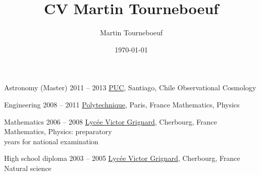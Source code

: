 \def\tbflanguage{english}

\ifx\HCode\undefined
  \providecommand{\tbfbordertop}{1.2}
  \providecommand\tbfborderleft{0.7}
  \providecommand\tbfwidth{12.4}
\else
  \providecommand{\tbfbordertop}{1}
  \providecommand\tbfborderleft{0.7}
  \providecommand\tbfwidth{12.4}

\ifx\HCode\undefined

%
\else

%
\fi

\title{CV Martin Tourneboeuf}
\author{Martin Tourneboeuf}
\date{\today}









\begin{coordinatelist}
\end{coordinatelist}



\pgfmathsetmacro{\tbfyeary}{\tbfbordertop+3.1}

\begin{yearlist}[7.7][\tbfborderleft][\tbfyeary]


\item[Astronomy (Master)]{2011 -- 2013}
  {
  \href{http://www.uc.cl/}{PUC}, Santiago, Chile
  }
  {   Observational Cosmology}


\item[Engineering]{2008 -- 2011}
  {
  \tbfix
  \href{https://www.polytechnique.edu/}{Polytechnique}, Paris, France
  }
  {    Mathematics, Physics}


\item[Mathematics]{2006 -- 2008}
  {
  \href{http://www.lycee-grignard.fr/}{Lyc\'ee Victor Grignard}, Cherbourg, France
  }
  {    Mathematics, Physics: preparatory \\ years for national examination}


\item[High school diploma]{2003 -- 2005}
  {
  \href{http://www.lycee-grignard.fr/}{Lyc\'ee Victor Grignard}, Cherbourg, France
  }
  {    Natural science}

\end{yearlist}




